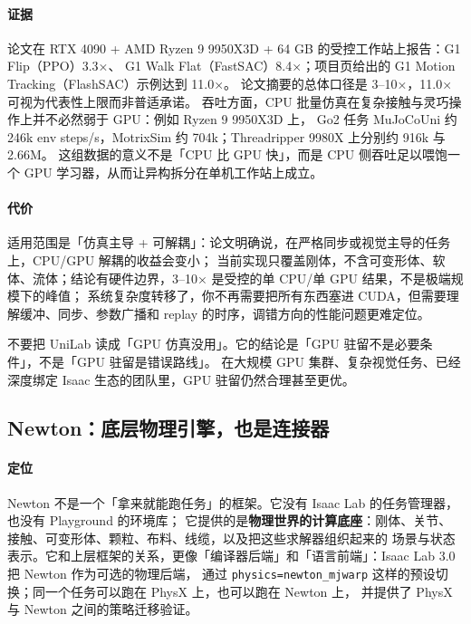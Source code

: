 \documentclass[UTF8, 11pt, a4paper, fontset=windows]{ctexart}
\newcommand{\term}[1]{\texttt{#1}}
\begin{document}
\paragraph{证据}
论文在 RTX 4090 + AMD Ryzen 9 9950X3D + 64 GB 的受控工作站上报告：G1 Flip（PPO）3.3×、
G1 Walk Flat（FastSAC）8.4×；项目页给出的 G1 Motion Tracking（FlashSAC）示例达到 11.0×。
论文摘要的总体口径是 3--10×，11.0× 可视为代表性上限而非普适承诺。
吞吐方面，CPU 批量仿真在复杂接触与灵巧操作上并不必然弱于 GPU：例如 Ryzen 9 9950X3D 上，
Go2 任务 MuJoCoUni 约 246k env steps/s，MotrixSim 约 704k；Threadripper 9980X 上分别约 916k 与 2.66M。
这组数据的意义不是「CPU 比 GPU 快」，而是 CPU 侧吞吐足以喂饱一个 GPU 学习器，从而让异构拆分在单机工作站上成立。

\paragraph{代价}
适用范围是「仿真主导 + 可解耦」：论文明确说，在严格同步或视觉主导的任务上，CPU/GPU 解耦的收益会变小；
当前实现只覆盖刚体，不含可变形体、软体、流体；结论有硬件边界，3--10× 是受控的单 CPU/单 GPU 结果，不是极端规模下的峰值；
系统复杂度转移了，你不再需要把所有东西塞进 CUDA，但需要理解缓冲、同步、参数广播和 replay 的时序，调错方向的性能问题更难定位。

\begin{caution}
不要把 UniLab 读成「GPU 仿真没用」。它的结论是「GPU 驻留不是必要条件」，不是「GPU 驻留是错误路线」。
在大规模 GPU 集群、复杂视觉任务、已经深度绑定 Isaac 生态的团队里，GPU 驻留仍然合理甚至更优。
\end{caution}

\subsection{Newton：底层物理引擎，也是连接器}

\paragraph{定位}
Newton 不是一个「拿来就能跑任务」的框架。它没有 Isaac Lab 的任务管理器，也没有 Playground 的环境库；
它提供的是\textbf{物理世界的计算底座}：刚体、关节、接触、可变形体、颗粒、布料、线缆，以及把这些求解器组织起来的
场景与状态表示。它和上层框架的关系，更像「编译器后端」和「语言前端」：Isaac Lab 3.0 把 Newton 作为可选的物理后端，
通过 \term{physics=newton\_mjwarp} 这样的预设切换；同一个任务可以跑在 PhysX 上，也可以跑在 Newton 上，
并提供了 PhysX 与 Newton 之间的策略迁移验证。
\end{document}
